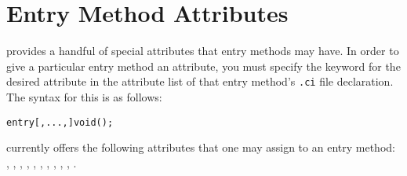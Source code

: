 \section{Entry Method Attributes}

\label{attributes}

\charmpp{}  provides a handful of special attributes that entry methods may have.  In order to give a particular entry method an attribute, you must specify the keyword for the desired
attribute in the attribute list of that entry method's {\tt .ci} file
declaration.  The syntax for this is as follows:

\begin{alltt}
entry [, ..., ] void ();
\end{alltt}

\charmpp{} currently offers the following attributes that one may assign to 
an entry method:
, , , , , , , , , , .

